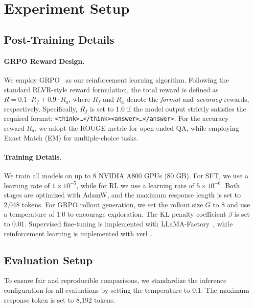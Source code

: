 \clearpage
\section{Experiment Setup}
\subsection{Post-Training Details}\label{app:exp-details}
\paragraph{GRPO Reward Design.}
We employ GRPO~\cite{shao2024deepseekmath} as our reinforcement learning algorithm. Following the standard RLVR-style reward formulation, the total reward is defined as $R = 0.1 \cdot R_f + 0.9 \cdot R_a$, where $R_f$ and $R_a$ denote the \textit{format} and \textit{accuracy} rewards, respectively. Specifically, $R_f$ is set to $1.0$ if the model output strictly satisfies the required format: \texttt{<think>\ldots</think><answer>\ldots</answer>}. For the accuracy reward $R_a$, we adopt the ROUGE metric for open-ended QA, while employing Exact Match (EM) for multiple-choice tasks.

\paragraph{Training Details.} \label{app:train-details}
We train all models on up to 8 NVIDIA A800 GPUs (80 GB). 
For SFT, we use a learning rate of $1\times10^{-5}$, while for RL we use a learning rate of $5\times10^{-6}$. 
Both stages are optimized with AdamW, and the maximum response length is set to 2,048 tokens. 
For GRPO rollout generation, we set the rollout size $G$ to 8 and use a temperature of 1.0 to encourage exploration. 
The KL penalty coefficient $\beta$ is set to 0.01. 
Supervised fine-tuning is implemented with LLaMA-Factory~\cite{zheng2024llamafactoryunifiedefficientfinetuning}, while reinforcement learning is implemented with verl~\cite{verl}.

\subsection{Evaluation Setup}
\label{app:model-config}
To ensure fair and reproducible comparisons, we standardize the inference configuration for all evaluations by setting the temperature to $0.1$. The maximum response token is set to 8,192 tokens.



